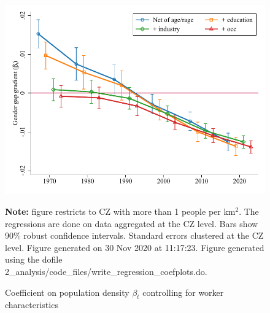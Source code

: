 \begin{figure}[!h]
\centering
\caption{Coefficient on population density $ \beta_t $ controlling for worker characteristics}
\label{fig:controls}
\includegraphics[width=1\textwidth]{../2_analysis/output/figures/with_control_gradients_individual_l_czone_density_full_time}
\par \begin{minipage}[h]{\textwidth}{\tiny\textbf{Note:} figure restricts to CZ with more than 1 people per km$^2$. The regressions are done on data aggregated at the CZ level. Bars show 90\% robust confidence intervals. Standard errors clustered at the CZ level. Figure generated on 30 Nov 2020 at 11:17:23. Figure generated using the dofile 2\_analysis/code\_files/write\_regression\_coefplots.do.}\end{minipage}
\end{figure}
